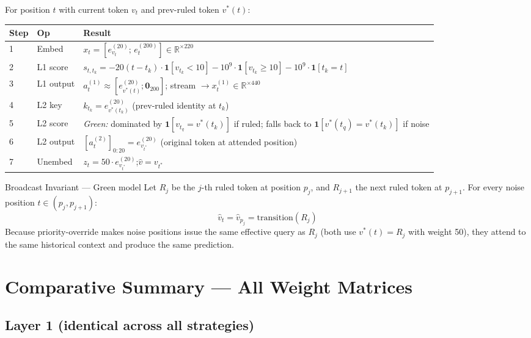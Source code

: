 \documentclass[11pt]{article}
\newcommand{\R}{\mathbb{R}}
\begin{document}
For position $t$ with current token $v_t$ and prev-ruled token $v^*(t)$:

\begin{center}
\begin{tabular}{lll}
\toprule
\textbf{Step} & \textbf{Op} & \textbf{Result}\\
\midrule
1 & Embed
  & $x_t=[e_{v_t}^{(20)};\,e_t^{(200)}]\in\R^{\times220}$\\
2 & L1 score
  & $s_{t,t_k}=-20(t-t_k)\cdot\mathbf{1}[v_{t_k}<10]
    -{10^9}\cdot\mathbf{1}[v_{t_k}\geq10]-{10^9}\cdot\mathbf{1}[t_k=t]$\\
3 & L1 output
  & $a_t^{(1)}\approx[e_{v^*(t)}^{(20)};\mathbf{0}_{200}]$;
    stream $\to x_t^{(1)}\in\R^{\times440}$\\
4 & L2 key
  & $k_{t_k}=e_{v^*(t_k)}^{(20)}$ (prev-ruled identity at $t_k$)\\
5 & L2 score
  & \emph{Green:} dominated by $\mathbf{1}[v_{t_q}=v^*(t_k)]$ if ruled;
    falls back to $\mathbf{1}[v^*(t_q)=v^*(t_k)]$ if noise\\
6 & L2 output
  & $[a_t^{(2)}]_{0:20}=e_{v_{t^*}}^{(20)}$ (original token at attended position)\\
7 & Unembed
  & $z_t=50\cdot e_{v_{t^*}}^{(20)}$;\quad$\hat{v}=v_{t^*}$\\
\bottomrule
\end{tabular}
\end{center}

\begin{warningbox}{Broadcast Invariant --- Green model}
Let $R_j$ be the $j$-th ruled token at position $p_j$, and $R_{j+1}$ the next ruled token at
$p_{j+1}$. For every noise position $t\in(p_j,p_{j+1})$:
\[
\hat{v}_t=\hat{v}_{p_j}=\mathrm{transition}(R_j)
\]
Because priority-override makes noise positions issue the same effective query as $R_j$ (both use
$v^*(t)=R_j$ with weight 50), they attend to the same historical context and produce the same
prediction.
\end{warningbox}

\section{Comparative Summary --- All Weight Matrices}

\subsection{Layer 1 (identical across all strategies)}
\end{document}
